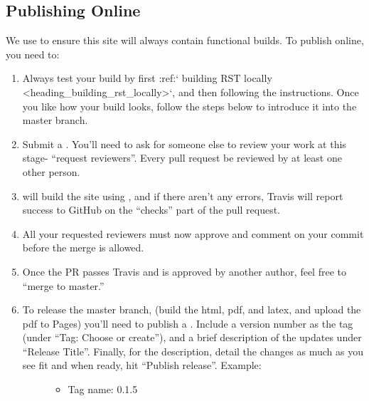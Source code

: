 \documentclass[letterpaper,10pt,english]{sphinxmanual}
\begin{document}
\subsection{Publishing Online}
\label{\detokenize{Textbook_Creation_Help/rst_intro:publishing-online}}\label{\detokenize{Textbook_Creation_Help/rst_intro:heading-publishing-online}}
We use  to ensure this site will always contain functional builds. To publish online, you need to:
\begin{enumerate}
\item {} 
Always test your build by first :ref:{}` building RST locally \textless{}heading\_building\_rst\_locally\textgreater{}{}`, and then following the {\hyperref[\detokenize{Textbook_Creation_Help/rst_intro:heading-testing-online}]{}} instructions. Once you like how your build looks, follow the steps below to introduce it into the master branch.

\item {} 
Submit a . You’ll need to ask for someone else to review your work at this stage- “request reviewers”. Every pull request  be reviewed by at least one other person.

\item {} 
 will build the site using , and if there aren’t any errors, Travis will report success to GitHub on the “checks” part of the pull request.

\item {} 
All your requested reviewers must now approve and comment on  your commit before the merge is allowed.

\item {} 
Once the PR passes Travis and is approved by another author, feel free to “merge to master.”

\item {} \begin{description}
\item[{To release the master branch, (build the html, pdf, and latex, and upload the pdf to Pages) you’ll need to publish a . Include a  version number as the tag (under “Tag: Choose or create”), and a brief description of the updates under “Release Title”. Finally, for the description, detail the changes as much as you see fit and when ready, hit “Publish release”. Example:}] \leavevmode\begin{itemize}
\item {} 
Tag name: 0.1.5


\end{itemize}
\end{description}
\end{enumerate}
\end{document}
